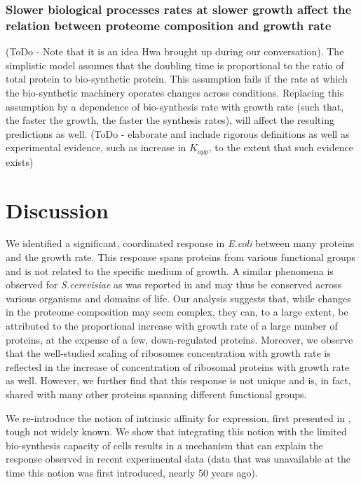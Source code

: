 \documentclass[notitlepage]{article}
\begin{document}
\subsubsection{Slower biological processes rates at slower growth affect the relation between proteome composition and growth rate}
(ToDo - Note that it is an idea Hwa brought up during our conversation).
The simplistic model assumes that the doubling time is proportional to the ratio of total protein to bio-synthetic protein.
This assumption fails if the rate at which the bio-synthetic machinery operates changes across conditions.
Replacing this assumption by a dependence of bio-synthesis rate with growth rate (such that, the faster the growth, the faster the synthesis rates), will affect the resulting predictions as well.
(ToDo - elaborate and include rigorous definitions as well as experimental evidence, such as increase in $K_{app}$, to the extent that such evidence exists)

\section{Discussion}
We identified a significant, coordinated response in \emph{E.coli} between many proteins and the growth rate.
This response spans proteins from various functional groups and is not related to the specific medium of growth.
A similar phenomena is observed for \emph{S.cerevisiae} as was reported in \parencite{Keren2013a} and may thus be conserved across various organisms and domains of life.
Our analysis suggests that, while changes in the proteome composition may seem complex, they can, to a large extent, be attributed to the proportional increase with growth rate of a large number of proteins, at the expense of a few, down-regulated proteins.
Moreover, we observe that the well-studied scaling of ribosomes concentration with growth rate is reflected in the increase of concentration of ribosomal proteins with growth rate as well.
However, we further find that this response is not unique and is, in fact, shared with many other proteins spanning different functional groups.

We re-introduce the notion of intrinsic affinity for expression, first presented in \parencite{Maaloe1969}, tough not widely known.
We show that integrating this notion with the limited bio-synthesis capacity of cells results in a mechanism that can explain the response observed in recent experimental data (data that was unavailable at the time this notion was first introduced, nearly 50 years ago).
\end{document}
